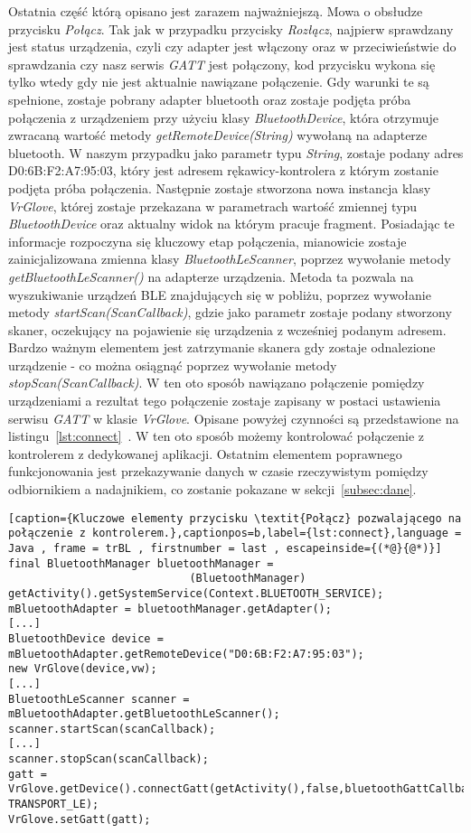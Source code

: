 Ostatnia część którą opisano jest zarazem najważniejszą. Mowa o obsłudze przycisku \textit{Połącz}. Tak jak w przypadku przycisky \textit{Rozłącz}, najpierw sprawdzany jest status urządzenia, czyli czy adapter jest włączony oraz w przeciwieństwie do sprawdzania czy nasz serwis \textit{GATT} jest połączony, kod przycisku wykona się tylko wtedy gdy nie jest aktualnie nawiązane połączenie. Gdy warunki te są spełnione, zostaje pobrany adapter bluetooth oraz zostaje podjęta próba połączenia z urządzeniem przy użyciu klasy \textit{BluetoothDevice}, która otrzymuje zwracaną wartość metody \textit{getRemoteDevice(String)} wywołaną na adapterze bluetooth. W naszym przypadku jako parametr typu \textit{String}, zostaje podany adres D0:6B:F2:A7:95:03, który jest adresem rękawicy-kontrolera z którym zostanie podjęta próba połączenia. Następnie zostaje stworzona nowa instancja klasy \textit{VrGlove}, której zostaje przekazana w parametrach wartość zmiennej typu \textit{BluetoothDevice} oraz aktualny widok na którym pracuje fragment. Posiadając te informacje rozpoczyna się kluczowy etap połączenia, mianowicie zostaje zainicjalizowana zmienna klasy \textit{BluetoothLeScanner}, poprzez wywołanie metody \textit{getBluetoothLeScanner()} na adapterze urządzenia. Metoda ta pozwala na wyszukiwanie urządzeń BLE znajdujących się w pobliżu, poprzez wywołanie metody \textit{startScan(ScanCallback)}, gdzie jako parametr zostaje podany stworzony skaner, oczekujący na pojawienie się urządzenia z wcześniej podanym adresem. Bardzo ważnym elementem jest zatrzymanie skanera gdy zostaje odnalezione urządzenie - co można osiągnąć poprzez wywołanie metody \textit{stopScan(ScanCallback)}. W ten oto sposób nawiązano połączenie pomiędzy urządzeniami a rezultat tego połączenie zostaje zapisany w postaci ustawienia serwisu \textit{GATT} w klasie \textit{VrGlove}. Opisane powyżej czynności są przedstawione na listingu~\ref{lst:connect}~\cite{AndroidDoc}. W ten oto sposób możemy kontrolować połączenie z kontrolerem z dedykowanej aplikacji. Ostatnim elementem poprawnego funkcjonowania jest przekazywanie danych w czasie rzeczywistym pomiędzy odbiornikiem a nadajnikiem, co zostanie pokazane w sekcji~\ref{subsec:dane}. \newpage
\begin{lstlisting}[caption={Kluczowe elementy przycisku \textit{Połącz} pozwalającego na połączenie z kontrolerem.},captionpos=b,label={lst:connect},language = Java , frame = trBL , firstnumber = last , escapeinside={(*@}{@*)}]
final BluetoothManager bluetoothManager =
                            (BluetoothManager) getActivity().getSystemService(Context.BLUETOOTH_SERVICE);
mBluetoothAdapter = bluetoothManager.getAdapter();
[...]
BluetoothDevice device = mBluetoothAdapter.getRemoteDevice("D0:6B:F2:A7:95:03");
new VrGlove(device,vw);                    
[...]
BluetoothLeScanner scanner = mBluetoothAdapter.getBluetoothLeScanner();
scanner.startScan(scanCallback);
[...]
scanner.stopScan(scanCallback);
gatt = VrGlove.getDevice().connectGatt(getActivity(),false,bluetoothGattCallback, TRANSPORT_LE);
VrGlove.setGatt(gatt);                                                           
\end{lstlisting} 

